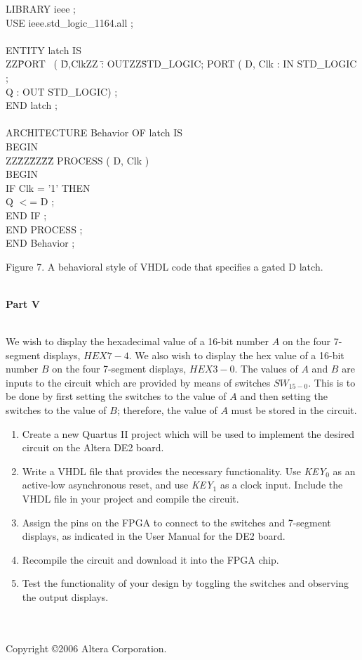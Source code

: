 \documentclass[epsfig,10pt,fullpage]{article}
\begin{document}
\begin{center}
\begin{minipage}[t]{12.5 cm}
\begin{tabbing}
LIBRARY ieee ; \\
USE ieee.std\_logic\_1164.all ; \\
~\\
ENTITY latch IS \\
ZZ\=PORT ~( \=D,ClkZZ \=: OUTZZ\=STD\_LOGIC;\kill
\>PORT (	\>D, Clk \>: IN \>STD\_LOGIC ; \\
\>\>Q \>: OUT \>STD\_LOGIC) ; \\
END latch ;\\
~\\
ARCHITECTURE Behavior OF latch IS    \\
BEGIN\\
ZZ\=ZZ\=ZZ\=ZZ\=\kill
\>PROCESS ( D, Clk ) \\
\>BEGIN\\
\>\>IF Clk = '1' THEN \\
\>\>\>Q $<$= D ; \\
\>\>END IF ; \\
\>END PROCESS ; \\
END Behavior ;\\
\end{tabbing}
\end{minipage}
\end{center}
\begin{center}
Figure 7. A behavioral style of VHDL code that specifies a gated D latch.
\end{center}

~\\
\noindent
{\bf Part V}

~\\
\noindent
We wish to display the hexadecimal value of a 16-bit number $A$
on the four 7-segment displays, $HEX7-4$.
We also wish to display the
hex value of a 16-bit number $B$ on the four 7-segment displays,
$HEX3-0$. The values of $A$ and $B$ are inputs to the circuit which are
provided by means of switches $SW_{15-0}$. 
This is to be done by first setting the switches to the value of $A$ and
then setting the switches to the value of $B$; therefore, the value of $A$
must be stored in the circuit.
\begin{enumerate}
\item Create a new Quartus II project which will be used to implement the desired
circuit on the Altera DE2 board.
\item Write a VHDL file that provides the necessary functionality.  Use {\it KEY}$_0$ as
an active-low asynchronous reset, and use {\it KEY}$_1$ as a clock input.
Include the VHDL file in your project and compile the circuit.
\item Assign the pins on the FPGA to connect to the switches and 7-segment
displays, as indicated in the User Manual for the DE2 board.
\item Recompile the circuit and download it into the FPGA chip.
\item Test the functionality of your design by toggling the switches
and observing the output displays.
\end{enumerate}


~\\
~\\
Copyright \copyright 2006 Altera Corporation. 
\end{document}
